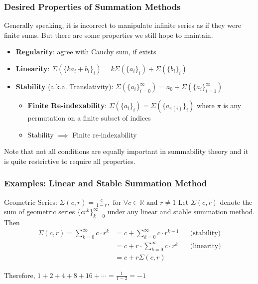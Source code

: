 \documentclass{beamer}
\begin{document}

\begin{frame}
\frametitle{Desired Properties of Summation Methods}

Generally speaking, it is incorrect to manipulate infinite series as if they were finite sums. But there are some properties we still hope to maintain. 

\begin{itemize}
    \item \textbf{Regularity}: agree with Cauchy sum, if exists
    \item \textbf{Linearity}: $ \Sigma( \{ k a_i + b_i \}_i ) = k \Sigma( \{ a_i \}_i ) + \Sigma( \{ b_i \}_i )$
    \item \textbf{Stability} (a.k.a. Translativity): $ \Sigma( \{ a_i \}_{i=0}^{\infty} ) = a_0 + \Sigma( \{ a_i \}_{i=1}^{\infty} ) $
    \begin{itemize}
        \item \textbf{Finite Re-indexability}: $ \Sigma( \{a_i\}_i ) =  \Sigma( \{a_{\pi(i)}\}_i )$ where $\pi$ is any permutation on a finite subset of indices 
        \item Stability $\implies$ Finite re-indexability
    \end{itemize}
\end{itemize}

Note that not all conditions are equally important in summability theory and it is quite restrictive to require all properties. 

\end{frame}


\begin{frame}
\frametitle{Examples: Linear and Stable Summation Method}

\begin{block}{Geometric Series: $ \Sigma(c, r) = \frac{c}{1-r}, \text{ for } \forall c \in \mathbb{R} \text{ and } r \neq 1 $}
Let $\Sigma(c, r)$ denote the sum of geometric series $ \{cr^k\}_{k=0}^{\infty} $ under any linear and stable summation method. Then 
\begin{align*}
    \Sigma(c, r) 
     = \sum_{k=0}^{\infty} c \cdot r^k 
    &= c + \sum_{k=0}^{\infty} c \cdot r^{k+1} && \text{(stability)} \\ 
    &= c + r \cdot \sum_{k=0}^{\infty} c \cdot r^k && \text{(linearity)} \\ 
    &= c + r \Sigma(c, r) 
\end{align*}
\end{block}

Therefore, $ 1 + 2 + 4 + 8 + 16 + \cdots = \frac{1}{1 - 2} = -1$

\end{frame}
\end{document}
